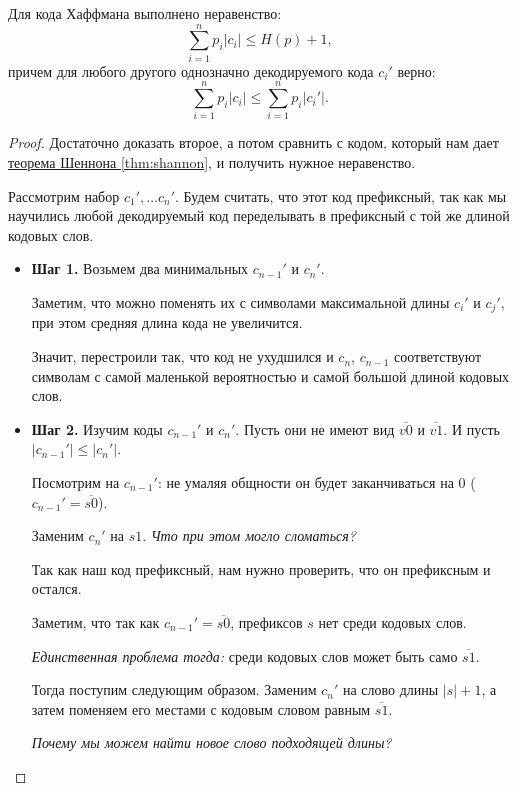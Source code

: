 \begin{thm}
Для кода Хаффмана выполнено неравенство:
$$ \sum_{i=1}^{n} p_i \lvert c_i \rvert \le H(p) + 1,$$ 
причем для любого другого однозначно декодируемого кода $c_i'$ верно: 
$$ \sum_{i=1}^{n} p_i \lvert c_i \rvert  \le \sum_{i=1}^{n} p_i \lvert c_i' \rvert .$$
\end{thm}
\begin{proof}
	Достаточно доказать второе, а потом сравнить с кодом, который нам дает \hyperref[thm:shannon]{теорема Шеннона \ref{thm:shannon}}, и получить нужное неравенство.

Рассмотрим набор $  c_1', \ldots c_n'$.
Будем считать, что этот код префиксный, так как мы научились любой декодируемый код переделывать в префиксный с той же длиной кодовых слов. 

\begin{itemize}
	\item \textbf{Шаг 1.} Возьмем два минимальных $ c_{n-1}'$ и $ c_n'$. 

		Заметим, что можно поменять их с символами максимальной длины  $ c_i'$ и $ c_j'$, при этом средняя длина кода не увеличится. 

		Значит, перестроили так, что код не ухудшился и $c_n$, $c_{n-1}$ соответствуют символам с самой маленькой вероятностью и самой большой длиной кодовых слов.
    
	\item \textbf{Шаг 2.} Изучим коды $ c_{n-1}'$ и $ c_n'$.
		Пусть они не имеют вид $ \overline{v 0}$ и $ \overline{v 1}$. И пусть $ \lvert c_{n-1}' \rvert  \le  \lvert c_n' \rvert $.

		Посмотрим на $ c_{n-1}'$: не умаляя общности он будет заканчиваться на $ 0$ ($c_{n-1}'= \overline{s 0}$). 

		Заменим $ c_n'$ на $ s 1$. \textit{Что при этом могло сломаться?}

		Так как наш код префиксный, нам нужно проверить, что он префиксным и остался.

		Заметим, что так как $c_{n-1}' = \overline{s 0}$, префиксов $s$ нет среди кодовых слов. 

		\textit{Единственная проблема тогда:} среди кодовых слов может быть само $\overline{s 1}$.

		Тогда поступим следующим образом. 
		Заменим $c_n'$ на слово длины $\lvert s \rvert +1$, а затем поменяем его местами с кодовым словом равным $\overline{s1}$. 

		\textit{Почему мы можем найти новое слово подходящей длины?}


\end{itemize}
\end{proof}

